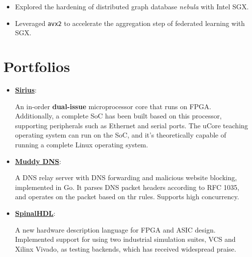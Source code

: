 \documentclass{resume}
\newcommand{\en}[1]{#1}
\newcommand{\zh}[1]{}
\begin{document}
\en{}
\zh{\datedsubsection{\textbf{清华大学信息技术研究院}}{10/2019 -- 04/2020}}
\en{}
\zh{\role{网络安全实验室}{科研实习}}
\begin{itemize}
      \item \en{Explored the hardening of distributed graph database \textit{nebula} with Intel SGX.}
            \zh{探索使用 Intel SGX 技术对分布式图数据库 \textit{nebula} 进行加固。}
      \item \en{Leveraged \texttt{avx2} to accelerate the aggregation step of federated learning with SGX.}
            \zh{利用 \texttt{avx2} 指令集加速了 SGX 技术下联邦学习的模型聚合。}
\end{itemize}

\section{\en{Portfolios}\zh{个人项目}}
\begin{itemize}[parsep=0.25ex]
      \item \textbf{\href{https://github.com/name1e5s/Sirius}{Sirius}}:
            \en{
                An in-order \textbf{dual-issue} microprocessor core that runs on FPGA.
                Additionally, a complete SoC has been built based on this processor, supporting peripherals such as Ethernet and serial ports.
                The uCore teaching operating system can run on the SoC, and it's theoretically capable of running a complete Linux operating system.
            }
            \zh{
                运行于 FPGA 上的\textbf{顺序双发射} MIPS 微处理器。
                此外，基于该处理器搭建了完整的 SoC，支持网口、串口等外设。SoC 上可以运行 uCore 教学用操作系统，理论上能够运行完整的 Linux 操作系统。
            }
      \item \textbf{\href{https://github.com/name1e5s/MuddyDNS}{Muddy DNS}}:
            \en{
                A DNS relay server with DNS forwarding and malicious website blocking, implemented in Go.
                It parses DNS packet headers according to RFC 1035, and operates on the packet based on thr rules.
                Supports high concurrency.
            }
            \zh{支持 DNS 转发及不良网址拦截的中继服务器，使用 Go 实现。按照 RFC 1035 所述规范解析 DNS 包头，根据处理后的结果对 DNS 包进行操作，支持高并发。}
      \item \textbf{\href{https://github.com/SpinalHDL/SpinalHDL}{SpinalHDL}}:
            \en{
                A new hardware description language for FPGA and ASIC design.
                Implemented support for using two industrial simulation suites, 
                VCS and Xilinx Vivado, as testing backends, which has received widespread praise.
            }
            \zh{SpinalHDL 是新一代的硬件语言。为其实现了将 VCS 以及 Xilinx Vivado 两大工业仿真套件作为测试后端，得到广泛好评。}
\end{itemize}
\end{document}
